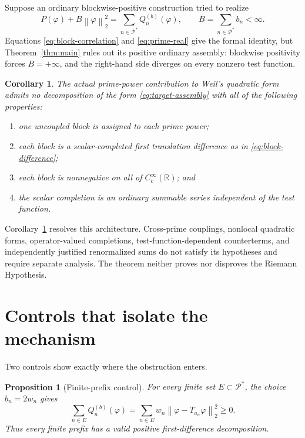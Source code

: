 \documentclass[11pt,a4paper]{amsart}
\newcommand{\R}{\mathbb{R}}
\newcommand{\PP}{\mathcal{P}^{\!*}}
\newcommand{\norm}[1]{\left\lVert #1\right\rVert_{2}}
\theoremstyle{plain}
\newtheorem{proposition}[theorem]{Proposition}
\newtheorem{corollary}[theorem]{Corollary}
\theoremstyle{definition}
\begin{document}
Suppose an ordinary blockwise-positive construction tried to realize
\begin{equation}\label{eq:target-assembly}
 P(\varphi)+B\norm{\varphi}^{2}
 =\sum_{n\in\PP}Q_n^{(b)}(\varphi),
 \qquad B=\sum_{n\in\PP}b_n<\infty.
\end{equation}
Equations \eqref{eq:block-correlation} and \eqref{eq:prime-real} give the
formal identity, but Theorem~\ref{thm:main} rules out its positive ordinary
assembly: blockwise positivity forces $B=+\infty$, and the right-hand side
diverges on every nonzero test function.

\begin{corollary}\label{cor:weil-scope}
The actual prime-power contribution to Weil's quadratic form admits no
decomposition of the form \eqref{eq:target-assembly} with all of the following
properties:
\begin{enumerate}
\item one uncoupled block is assigned to each prime power;
\item each block is a scalar-completed first translation difference as in
      \eqref{eq:block-difference};
\item each block is nonnegative on all of $C_c^\infty(\R)$; and
\item the scalar completion is an ordinary summable series independent of the
      test function.
\end{enumerate}
\end{corollary}

Corollary~\ref{cor:weil-scope} resolves this architecture.  Cross-prime
couplings, nonlocal quadratic forms, operator-valued completions,
test-function-dependent counterterms, and independently justified
renormalized sums do not satisfy its hypotheses and require separate
analysis.  The theorem neither proves nor disproves the Riemann Hypothesis.

\section{Controls that isolate the mechanism}

Two controls show exactly where the obstruction enters.

\begin{proposition}[Finite-prefix control]\label{prop:finite-control}
For every finite set $E\subset\PP$, the choice $b_n=2w_n$ gives
\[
 \sum_{n\in E}Q_n^{(b)}(\varphi)
 =\sum_{n\in E}w_n\norm{\varphi-T_{a_n}\varphi}^{2}\geq0.
\]
Thus every finite prefix has a valid positive first-difference decomposition.
\end{proposition}
\end{document}
